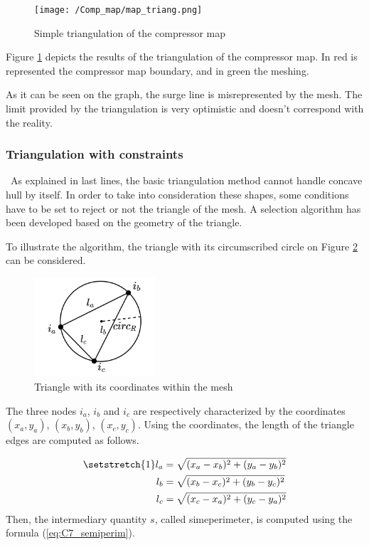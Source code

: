 \begin{figure}[h]
    \centering
    \texttt{[image: /Comp\_map/map\_triang.png]}
    \caption{Simple triangulation of the compressor map}
    \label{fig:C7_trimap}
\end{figure}

Figure \ref{fig:C7_trimap} depicts the results of the triangulation of the compressor map. In red is represented the compressor map boundary, and in green the meshing.

As it can be seen on the graph, the surge line is misrepresented by the mesh. The limit provided by the triangulation is very optimistic and doesn't correspond with the reality. 

\subsubsection{Triangulation with constraints}
\quad\ As explained in last lines, the basic triangulation method cannot handle concave hull by itself. In order to take into consideration these shapes, some conditions have to be set to reject or not the triangle of the mesh. A selection algorithm  has been developed \cite{Dwyer2014} based on the geometry of the triangle.

To illustrate the algorithm, the triangle with its circumscribed circle on Figure \ref{fig:C7_triangmesh} can be considered.

\begin{figure}[h]
    \centering
    \includegraphics[width=0.4\textwidth]{Comp_map/triang_mesh.png}
    \caption{Triangle with its coordinates within the mesh}
    \label{fig:C7_triangmesh}
\end{figure}

The three nodes $i_a$, $i_b$ and $i_c$ are respectively characterized by the coordinates $(x_a,y_a)$, $(x_b,y_b)$, $(x_c,y_c)$. Using the coordinates, the length of the triangle edges are computed as follows.

\begin{align*}
    \setstretch{1}
    l_a &= \sqrt{(x_a - x_b)^2 + (y_a - y_b)^2}\\
    l_b &= \sqrt{(x_b - x_c)^2 + (y_b - y_c)^2}\\
    l_c &= \sqrt{(x_c - x_a)^2 + (y_c - y_a)^2}
\end{align*}
Then, the intermediary quantity $s$, called simeperimeter, is computed using the formula (\ref{eq:C7_semiperim}).

